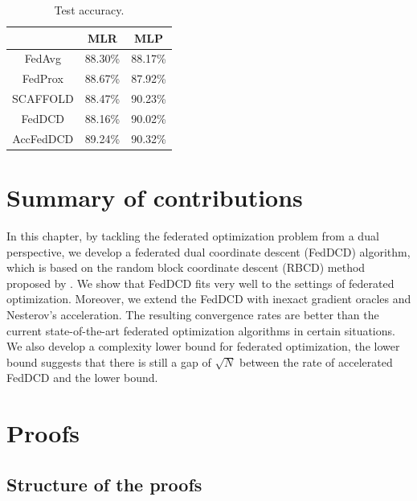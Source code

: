 \begin{table}[t]
    \centering
    \begin{tabular}{ccc}
    \toprule
                    &  MLR      & MLP \\ \hline
        FedAvg      &  88.30\%  & 88.17\% \\
        FedProx     &  88.67\%  & 87.92\% \\ 
        SCAFFOLD    &  88.47\%  & 90.23\% \\
        FedDCD      &  88.16\%  & 90.02\% \\
        AccFedDCD   &  89.24\%  & 90.32\% \\
    \bottomrule
    \end{tabular}
    \caption{Test accuracy.}
    \label{tab:exp3}
\end{table}

\section{Summary of contributions}

In this chapter, by tackling the federated optimization problem from a dual perspective, we develop a federated dual coordinate descent (FedDCD) algorithm, which is based on the random block coordinate descent (RBCD) method proposed by \citet{necoara2017random}. We show that FedDCD fits very well to the settings of federated optimization. Moreover, we extend the FedDCD with inexact gradient oracles and Nesterov's acceleration. The resulting convergence rates are better than the current state-of-the-art federated optimization algorithms in certain situations. We also develop a complexity lower bound for federated optimization, the lower bound suggests that there is still a gap of $\sqrt{N}$ between the rate of accelerated FedDCD and the lower bound.



\section{Proofs}

\subsection{Structure of the proofs}

